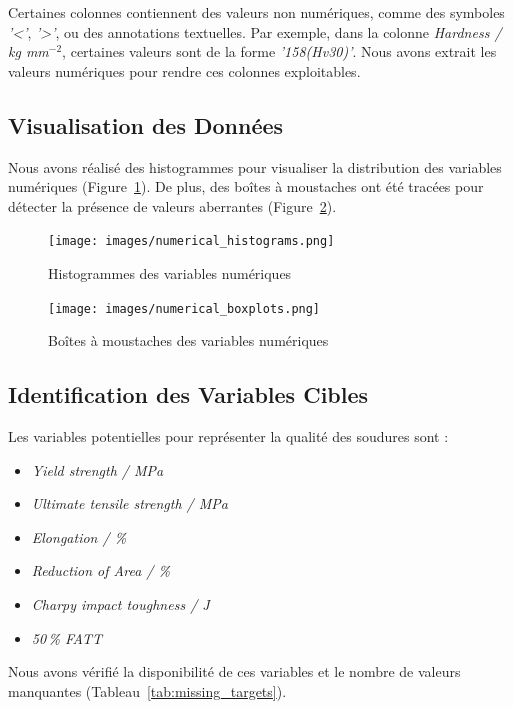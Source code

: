 \documentclass{article}
\begin{document}
Certaines colonnes contiennent des valeurs non numériques, comme des symboles \textit{'<'}, \textit{'>'}, ou des annotations textuelles. Par exemple, dans la colonne \textit{Hardness / kg mm$^{-2}$}, certaines valeurs sont de la forme \textit{'158(Hv30)'}. Nous avons extrait les valeurs numériques pour rendre ces colonnes exploitables.

\subsection{Visualisation des Données}

Nous avons réalisé des histogrammes pour visualiser la distribution des variables numériques (Figure~\ref{fig:histograms}). De plus, des boîtes à moustaches ont été tracées pour détecter la présence de valeurs aberrantes (Figure~\ref{fig:boxplots}).

\begin{figure}[H]
    \centering
    \texttt{[image: images/numerical\_histograms.png]}
    \caption{Histogrammes des variables numériques}
    \label{fig:histograms}
\end{figure}

\begin{figure}[H]
    \centering
    \texttt{[image: images/numerical\_boxplots.png]}
    \caption{Boîtes à moustaches des variables numériques}
    \label{fig:boxplots}
\end{figure}

\subsection{Identification des Variables Cibles}

Les variables potentielles pour représenter la qualité des soudures sont :

\begin{itemize}
    \item \textit{Yield strength / MPa}
    \item \textit{Ultimate tensile strength / MPa}
    \item \textit{Elongation / \%}
    \item \textit{Reduction of Area / \%}
    \item \textit{Charpy impact toughness / J}
    \item \textit{50\,\% FATT}
\end{itemize}

Nous avons vérifié la disponibilité de ces variables et le nombre de valeurs manquantes (Tableau~\ref{tab:missing_targets}).
\end{document}
